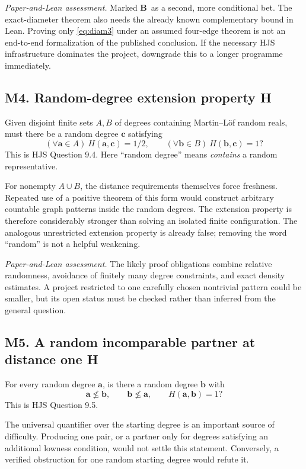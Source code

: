\documentclass[11pt,a4paper]{article}
\newcommand{\adeg}{\mathbf a}\newcommand{\bdeg}{\mathbf b}
\newcommand{\cdeg}{\mathbf c}\newcommand{\ddeg}{\mathbf d}
\newcommand{\Wmark}{\textbf{B}}\newcommand{\Pmark}{\textbf{R}}\newcommand{\Lmark}{\textbf{H}}
\newcommand{\assessment}[1]{\par\noindent\textit{Paper-and-Lean assessment.} #1\par}
\theoremstyle{definition}\newtheorem{definition}[theorem]{Definition}
\theoremstyle{remark}\newtheorem{remark}[theorem]{Remark}
\begin{document}
\assessment{Marked \Wmark\ as a second, more conditional bet. The exact-diameter theorem also needs the already known complementary bound in Lean. Proving only \eqref{eq:diam3} under an assumed four-edge theorem is not an end-to-end formalization of the published conclusion. If the necessary HJS infrastructure dominates the project, downgrade this to a longer programme immediately.}

\subsection{M4. Random-degree extension property \Lmark}
\label{entry:M4}

Given disjoint finite sets $A,B$ of degrees containing Martin--L\"of random reals, must there be a random degree $\cdeg$ satisfying
\[
 (\forall\adeg\in A)\ H(\adeg,\cdeg)=1/2,
 \qquad
 (\forall\bdeg\in B)\ H(\bdeg,\cdeg)=1?
\]
This is HJS Question 9.4. Here ``random degree'' means \emph{contains} a random representative.\cite{HJS}

For nonempty $A\cup B$, the distance requirements themselves force freshness. Repeated use of a positive theorem of this form would construct arbitrary countable graph patterns inside the random degrees. The extension property is therefore considerably stronger than solving an isolated finite configuration. The analogous unrestricted extension property is already false; removing the word ``random'' is not a helpful weakening.\cite{HJS}

\assessment{The likely proof obligations combine relative randomness, avoidance of finitely many degree constraints, and exact density estimates. A project restricted to one carefully chosen nontrivial pattern could be smaller, but its open status must be checked rather than inferred from the general question.}

\subsection{M5. A random incomparable partner at distance one \Lmark}
\label{entry:M5}

For every random degree $\adeg$, is there a random degree $\bdeg$ with
\[
 \adeg\not\leq\bdeg,\qquad \bdeg\not\leq\adeg,
 \qquad H(\adeg,\bdeg)=1?
\]
This is HJS Question 9.5.\cite{HJS}

The universal quantifier over the starting degree is an important source of difficulty. Producing one pair, or a partner only for degrees satisfying an additional lowness condition, would not settle this statement. Conversely, a verified obstruction for one random starting degree would refute it.
\end{document}
